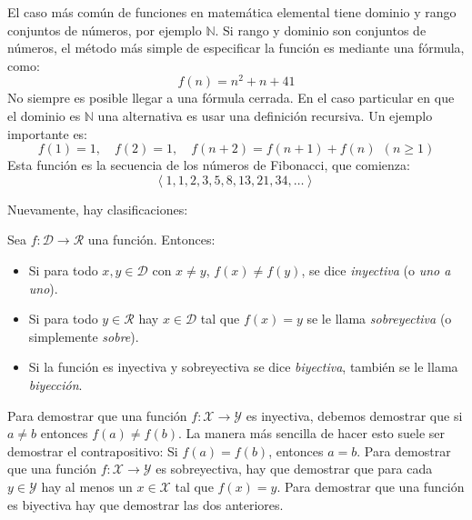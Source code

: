   El caso más común de funciones en matemática elemental
  tiene dominio y rango conjuntos de números,
  por ejemplo \(\mathbb{N}\).
  Si rango y dominio son conjuntos de números,
  el método más simple de especificar la función
  es mediante una fórmula,
  como:
  \begin{equation*}
    f(n) = n^2 + n + 41
  \end{equation*}
  No siempre es posible llegar a una fórmula cerrada.
  En el caso particular en que el dominio es \(\mathbb{N}\)
  una alternativa es usar una definición recursiva.
  Un ejemplo importante es:
  \begin{equation*}
    f(1)
      = 1, \quad
	f(2)
	  = 1, \quad
	f(n + 2)
	  = f(n + 1) + f(n)\;\,(n \ge 1)
  \end{equation*}
  Esta función es la secuencia de los números de Fibonacci,
  que comienza:
  \begin{equation*}
    \left\langle 1, 1, 2, 3, 5, 8, 13, 21, 34, \dotsc \right\rangle\
  \end{equation*}

  Nuevamente,
  hay clasificaciones:
  \begin{definition}
    Sea \(f \colon \mathcal{D} \rightarrow \mathcal{R}\) una función.
    Entonces:
    \begin{itemize}
    \item
      Si para todo \(x, y \in \mathcal{D}\)
      con \(x \ne y\), \(f(x) \ne f(y)\),
      se dice \emph{inyectiva}
      (o \emph{uno a uno}).
    \item
      Si para todo \(y \in \mathcal{R}\)
      hay \(x \in \mathcal{D}\) tal que \(f(x) = y\)
      se le llama \emph{sobreyectiva}
      (o simplemente \emph{sobre}).
    \item
      Si la función es inyectiva y sobreyectiva se dice \emph{biyectiva},
      también se le llama \emph{biyección}.
    \end{itemize}
  \end{definition}

  Para demostrar
  que una función \(f \colon \mathcal{X} \rightarrow \mathcal{Y}\)
  es inyectiva,
  debemos demostrar que si \(a \ne b\) entonces \(f(a) \ne f(b)\).
  La manera más sencilla de hacer esto suele ser demostrar el contrapositivo:
  Si \(f(a) = f(b)\),
  entonces \(a = b\).
  Para demostrar
  que una función \(f \colon \mathcal{X} \rightarrow \mathcal{Y}\)
  es sobreyectiva,
  hay que demostrar que para cada \(y \in \mathcal{Y}\)
  hay al menos un \(x \in \mathcal{X}\)
  tal que \(f(x) = y\).
  Para demostrar que una función es biyectiva
  hay que demostrar las dos anteriores.

